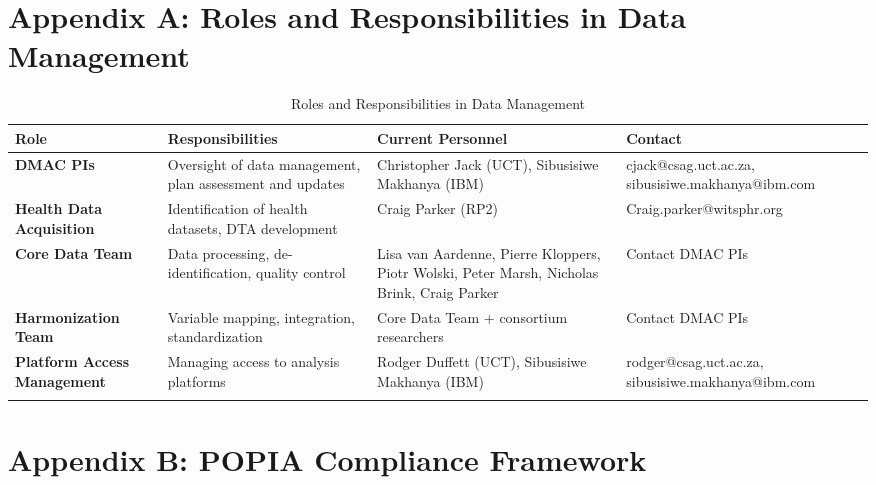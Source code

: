 \documentclass[12pt,a4paper,landscape]{article}
\begin{document}
\clearpage

\clearpage
\section*{Appendix A: Roles and Responsibilities in Data Management}

\begin{longtable}{L{3cm}L{6cm}L{5.5cm}L{5cm}}
\toprule
\textbf{Role} & \textbf{Responsibilities} & \textbf{Current Personnel} & \textbf{Contact} \\
\midrule
\endhead

\textbf{DMAC PIs} 
& Oversight of data management, plan assessment and updates 
& Christopher Jack (UCT), Sibusisiwe Makhanya (IBM) 
& cjack@csag.uct.ac.za, sibusisiwe.makhanya@ibm.com \\
\midrule

\textbf{Health Data Acquisition} 
& Identification of health datasets, DTA development 
& Craig Parker (RP2) 
& Craig.parker@witsphr.org \\
\midrule

\textbf{Core Data Team} 
& Data processing, de-identification, quality control 
& Lisa van Aardenne, Pierre Kloppers, Piotr Wolski, Peter Marsh, Nicholas Brink, Craig Parker 
& Contact DMAC PIs \\
\midrule

\textbf{Harmonization Team} 
& Variable mapping, integration, standardization 
& Core Data Team + consortium researchers 
& Contact DMAC PIs \\
\midrule

\textbf{Platform Access Management} 
& Managing access to analysis platforms 
& Rodger Duffett (UCT), Sibusisiwe Makhanya (IBM) 
& rodger@csag.uct.ac.za, sibusisiwe.makhanya@ibm.com \\
\bottomrule
\caption{Roles and Responsibilities in Data Management}
\end{longtable}

\clearpage
\section*{Appendix B: POPIA Compliance Framework}
\end{document}
